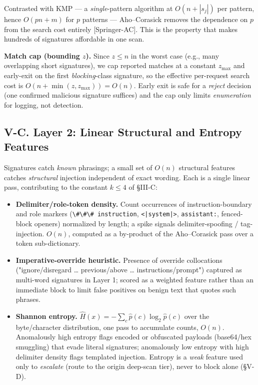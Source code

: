 Contrasted with KMP --- a \emph{single}-pattern algorithm at
\(O(n+|s_j|)\) per pattern, hence \(O(pn+m)\) for \(p\) patterns ---
Aho--Corasick removes the dependence on \(p\) from the search cost
entirely {[}Springer-AC{]}. This is the property that makes hundreds of
signatures affordable in one scan.

\textbf{Match cap (bounding \(z\)).} Since \(z\le n\) in the worst case
(e.g., many overlapping short signatures), we cap reported matches at a
constant \(z_{\max}\) and early-exit on the first \emph{blocking}-class
signature, so the effective per-request search cost is
\(O(n+\min(z,z_{\max}))=
O(n)\). Early exit is safe for a \emph{reject} decision (one confirmed
malicious signature suffices) and the cap only limits \emph{enumeration}
for logging, not detection.

\subsection{V-C. Layer 2: Linear Structural and Entropy
Features}\label{v-c-layer-2-linear-structural-and-entropy-features}

Signatures catch \emph{known} phrasings; a small set of \(O(n)\)
structural features catches \emph{structural} injection independent of
exact wording. Each is a single linear pass, contributing to the
constant \(k\le 4\) of §III-C:

\begin{itemize}
\tightlist
\item
  \textbf{Delimiter/role-token density.} Count occurrences of
  instruction-boundary and role markers
  (\passthrough{\lstinline!\#\#\# instruction!},
  \passthrough{\lstinline!<|system|>!},
  \passthrough{\lstinline!assistant:!}, fenced-block openers) normalized
  by length; a spike signals delimiter-spoofing / tag-injection.
  \(O(n)\), computed as a by-product of the Aho--Corasick pass over a
  token sub-dictionary.
\item
  \textbf{Imperative-override heuristic.} Presence of override
  collocations ("ignore/disregard \ldots{} previous/above \ldots{}
  instructions/prompt") captured as multi-word signatures in Layer 1;
  scored as a weighted feature rather than an immediate block to limit
  false positives on benign text that quotes such phrases.
\item
  \textbf{Shannon entropy.}
  \(\hat{H}(x)=-\sum_{c} \hat p(c)\log_2 \hat p(c)\) over the
  byte/character distribution, one pass to accumulate counts, \(O(n)\).
  Anomalously high entropy flags encoded or obfuscated payloads
  (base64/hex smuggling) that evade literal signatures; anomalously low
  entropy with high delimiter density flags templated injection. Entropy
  is a \emph{weak} feature used only to \emph{escalate} (route to the
  origin deep-scan tier), never to block alone (§V-D).
\end{itemize}

